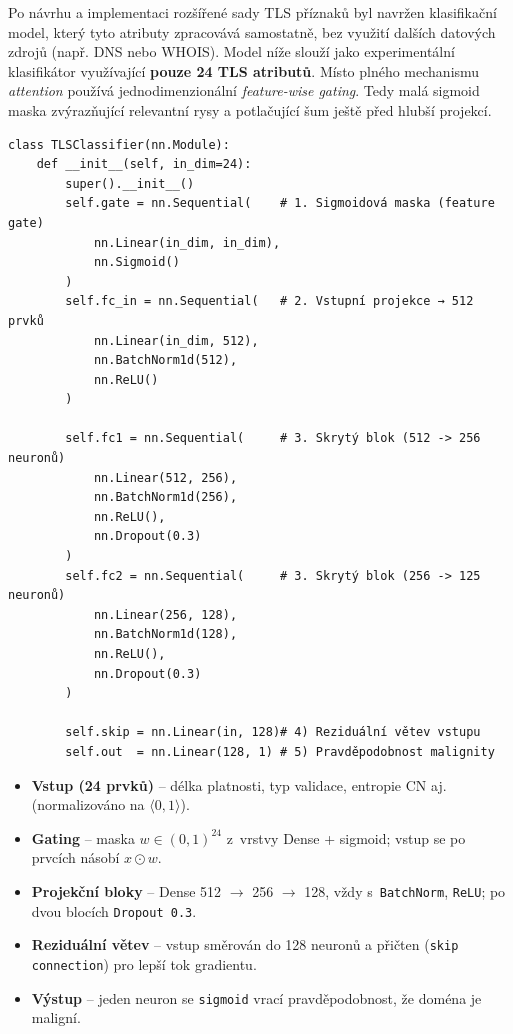 Po návrhu a implementaci rozšířené sady TLS příznaků byl navržen klasifikační model, který tyto atributy zpracovává samostatně, bez využití dalších datových zdrojů (např. DNS nebo WHOIS). Model níže slouží jako experimentální klasifikátor využívající \textbf{pouze 24 TLS atributů}. Místo plného mechanismu \emph{attention} používá jednodimenzionální \textit{feature-wise gating}. Tedy malá sigmoid maska zvýrazňující relevantní rysy a potlačující šum ještě před hlubší projekcí.

\vspace{0.3em}
\begin{samepage}
\begin{verbatim}
class TLSClassifier(nn.Module):
    def __init__(self, in_dim=24):
        super().__init__()
        self.gate = nn.Sequential(    # 1. Sigmoidová maska (feature gate)
            nn.Linear(in_dim, in_dim),   
            nn.Sigmoid()                 
        )
        self.fc_in = nn.Sequential(   # 2. Vstupní projekce → 512 prvků
            nn.Linear(in_dim, 512),
            nn.BatchNorm1d(512),
            nn.ReLU()
        )
        
        self.fc1 = nn.Sequential(     # 3. Skrytý blok (512 -> 256 neuronů)
            nn.Linear(512, 256),
            nn.BatchNorm1d(256),
            nn.ReLU(),
            nn.Dropout(0.3)
        )
        self.fc2 = nn.Sequential(     # 3. Skrytý blok (256 -> 125 neuronů)
            nn.Linear(256, 128),
            nn.BatchNorm1d(128),
            nn.ReLU(),
            nn.Dropout(0.3)
        )
        
        self.skip = nn.Linear(in, 128)# 4) Reziduální větev vstupu
        self.out  = nn.Linear(128, 1) # 5) Pravděpodobnost malignity

\end{verbatim}
\end{samepage}

\begin{itemize}
  \item \textbf{Vstup (24 prvků)} – délka platnosti, typ validace, entropie CN aj. (normalizováno na $\langle0,1\rangle$).
  \item \textbf{Gating} – maska $w\in(0,1)^{24}$ z~vrstvy Dense + sigmoid; vstup se po prvcích násobí $x \odot w$.
  \item \textbf{Projekční bloky} – Dense 512 $\rightarrow$ 256 $\rightarrow$ 128, vždy s~\texttt{BatchNorm}, \texttt{ReLU}; po dvou blocích \texttt{Dropout 0.3}.
  \item \textbf{Reziduální větev} – vstup směrován do 128 neuronů a přičten (\texttt{skip connection}) pro lepší tok gradientu.
  \item \textbf{Výstup} – jeden neuron se \texttt{sigmoid} vrací pravděpodobnost, že doména je maligní.
\end{itemize}


